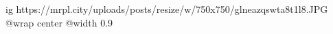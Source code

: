  
 
 
 
 

\ifcmt
  ig https://mrpl.city/uploads/posts/resize/w/750x750/glneazqswta8t1l8.JPG
  @wrap center
  @width 0.9
\fi
